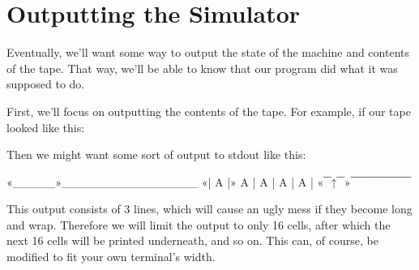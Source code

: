 \section{Outputting the Simulator}

Eventually, we'll want some way to output the state of the machine and contents of the tape. That way, we'll be able to know that our program did what it was supposed to do.

First, we'll focus on outputting the contents of the tape. For example, if our tape looked like this:

\begin{center}
\end{center}

Then we might want some sort of output to stdout like this:

\begin{stdout}
«_____»________________
«| A |» A | A | A | A |
«‾‾↑‾‾»‾‾‾‾‾‾‾‾‾‾‾‾‾‾‾‾
\end{stdout}

This output consists of 3 lines, which will cause an ugly mess if they become long and wrap. Therefore we will limit the output to only 16 cells, after which the next 16 cells will be printed underneath, and so on. This can, of course, be modified to fit your own terminal's width.

